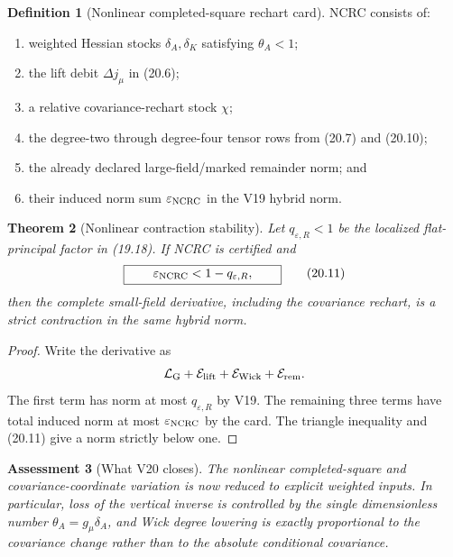 \documentclass[11pt,oneside]{book}
\newtheorem{theorem}{Theorem}[chapter]
\newtheorem{assessment}[theorem]{Assessment}
\theoremstyle{definition}
\newtheorem{definition}[theorem]{Definition}
\theoremstyle{remark}
\begin{document}
\begin{definition}[Nonlinear completed-square rechart card]
\label{def:e8v20-ncrc}
NCRC consists of:
\begin{enumerate}
\item weighted Hessian stocks \(\delta_A,\delta_K\) satisfying
\(\theta_A<1\);
\item the lift debit \(\Delta j_\mu\) in (20.6);
\item a relative covariance-rechart stock \(\chi\);
\item the degree-two through degree-four tensor rows from
(20.7) and (20.10);
\item the already declared large-field/marked remainder norm; and
\item their induced norm sum \(\varepsilon_{\rm NCRC}\) in the V19
hybrid norm.
\end{enumerate}
\end{definition}

\begin{theorem}[Nonlinear contraction stability]
\label{thm:e8v20-gate}
Let \(q_{\varepsilon,R}<1\) be the localized flat-principal factor in
(19.18).  If NCRC is certified and
\[
\boxed{\qquad
\varepsilon_{\rm NCRC}<1-q_{\varepsilon,R},
\qquad}                                                           \tag{20.11}
\]
then the complete small-field derivative, including the covariance
rechart, is a strict contraction in the same hybrid norm.
\end{theorem}

\begin{proof}
Write the derivative as
\[
\mathcal L_{\rm G}+\mathcal E_{\rm lift}
 +\mathcal E_{\rm Wick}+\mathcal E_{\rm rem}.
\]
The first term has norm at most \(q_{\varepsilon,R}\) by V19.
The remaining three terms have total induced norm at most
\(\varepsilon_{\rm NCRC}\) by the card.  The triangle inequality and
(20.11) give a norm strictly below one.
\end{proof}

\begin{assessment}[What V20 closes]
\label{ass:e8v20-closes}
The nonlinear completed-square and covariance-coordinate variation is
now reduced to explicit weighted inputs.  In particular, loss of the
vertical inverse is controlled by the single dimensionless number
\(\theta_A=g_\mu\delta_A\), and Wick degree lowering is exactly
proportional to the covariance change rather than to the absolute
conditional covariance.
\end{assessment}
\end{document}
